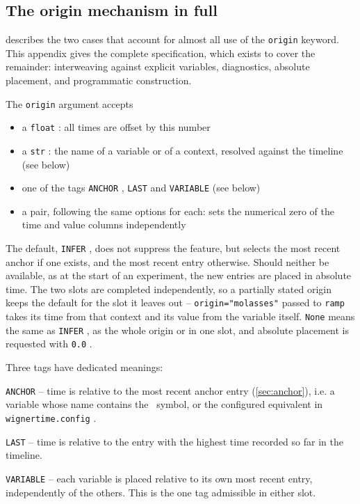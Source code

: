 \documentclass{SciPost}
\newcommand{\python}[1]{%
  \texttt{#1}%
}
\begin{document}
\begin{appendix}
 
\section{The origin mechanism in full}
\label{sec:origin_full}
 describes the two cases that account for almost all use of the \python{origin} keyword. This appendix gives the complete specification, which exists to cover the remainder: interweaving against explicit variables, diagnostics, absolute placement, and programmatic construction.
 
The \python{origin} argument accepts
\begin{itemize}
    \item a \python{float}: all times are offset by this number
    \item a \python{str}: the name of a variable or of a context, resolved against the timeline (see below)
    \item one of the tags \python{ANCHOR}, \python{LAST} and \python{VARIABLE} (see below)
    \item a pair, following the same options for each: sets the numerical zero of the time and value columns independently
\end{itemize}
The default, \python{INFER}, does not suppress the feature, but selects the most recent anchor if one exists, and the most recent entry otherwise. Should neither be available, as at the start of an experiment, the new entries are placed in absolute time. The two slots are completed independently, so a partially stated origin keeps the default for the slot it leaves out – \python{origin="molasses"} passed to \python{ramp} takes its time from that context and its value from the variable itself. \python{None} means the same as \python{INFER}, as the whole origin or in one slot, and absolute placement is requested with \python{0.0}.

Three tags have dedicated meanings:

\python{ANCHOR} – time is relative to the most recent anchor entry (\cref{sec:anchor}), i.e. a variable whose name contains the \faAnchor~symbol, or the configured equivalent in \python{wignertime.config}.

\python{LAST} – time is relative to the entry with the highest time recorded so far in the timeline.

\python{VARIABLE} – each variable is placed relative to its own most recent entry, independently of the others. This is the one tag admissible in either slot.


\end{appendix}
\end{document}
